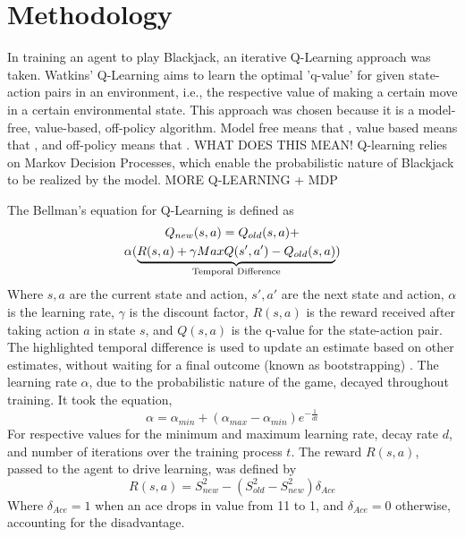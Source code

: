\section{Methodology}

In training an agent to play Blackjack, an iterative Q-Learning approach was taken. Watkins' Q-Learning aims to learn the optimal 'q-value' for given state-action pairs in an environment, i.e., the respective value of making a certain move in a certain environmental state. This approach was chosen because it is a model-free, value-based, off-policy algorithm. Model free means that , value based means that  , and off-policy means that   .
WHAT DOES THIS MEAN!  
Q-learning relies on Markov Decision Processes, which enable the probabilistic nature of Blackjack to be realized by the model. MORE Q-LEARNING + MDP

The Bellman's equation for Q-Learning is defined as
\begin{multline} \label{eq:Bellman}
    Q_{new}(s,a)=Q_{old}(s,a)+\\\alpha(\underbrace{R(s,a)+\gamma MaxQ(s',a')-Q_{old}(s,a)}_{\mathclap{\text{Temporal Difference}}})
\end{multline}
Where \( s, a \) are the current state and action,  \( s', a' \) are the next state and action, \( \alpha \) is the learning rate, \( \gamma \) is the discount factor, \( R(s,a) \) is the reward received after taking action \( a \) in state \( s \), and \( Q(s,a) \) is the q-value for the state-action pair. The highlighted temporal difference is 
used to update an estimate based on other estimates, without waiting for a final outcome (known as bootstrapping) \cite{10.5555/3312046}. The learning rate \(\alpha\), due to the probabilistic nature of the game, decayed throughout training. It took the equation, 
\begin{equation}
    \alpha = \alpha_{min} + (\alpha_{max} - \alpha_{min})e^{-\frac{1}{dt}}
\end{equation}
For respective values for the minimum and maximum learning rate, decay rate \(d\), and number of iterations over the training process \(t\). The reward \(R(s,a)\), passed to the agent to drive learning, was defined by
\begin{equation} \label{reward}
    R(s,a) = S_{new}^2 - (S_{old}^2 - S_{new}^2)\delta_{Ace}
\end{equation}
Where \(\delta_{Ace}=1\) when an ace drops in value from 11 to 1, and \(\delta_{Ace}=0\) otherwise, accounting for the disadvantage.

